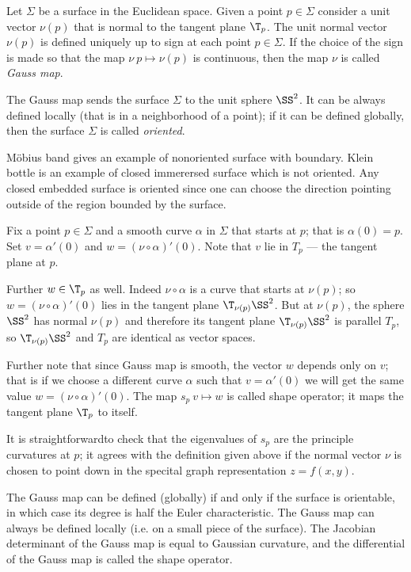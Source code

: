 Let $\Sigma$ be a surface in the Euclidean space.
Given a point $p\in\Sigma$ consider a unit vector $\nu(p)$ that is normal to the tangent plane $\T_p$. 
The unit normal vector $\nu(p)$ is defined uniquely up to sign at each point $p\in \Sigma$.
If the choice of the sign is made so that the map $\nu\:p\mapsto \nu(p)$ is continuous,
then the map $\nu$ is called \emph{Gauss map}.

The Gauss map sends the surface $\Sigma$ to the unit sphere $\SS^2$.
It can be always defined locally (that is in a neighborhood of a point);
if it can be defined globally, then the surface $\Sigma$ is called \emph{oriented}.

M\"obius band gives an example of nonoriented surface with boundary.
Klein bottle is an example of closed immerersed surface which is not oriented.
Any closed embedded surface is oriented since one can choose the  direction pointing outside of the region bounded by the surface.

Fix a point $p\in \Sigma$ and a smooth curve $\alpha$ in $\Sigma$ that starts at $p$;
that is $\alpha(0)=p$.
Set  $v=\alpha'(0)$ and $w=(\nu\circ\alpha)'(0)$.
Note that $v$ lie in $T_p$ --- the tangent plane at $p$.

Further $w\in \T_p$ as well.
Indeed $\nu\circ\alpha$ is a curve that starts at $\nu(p)$;
so $w=(\nu\circ\alpha)'(0)$ lies in the tangent plane $\T_{\nu(p)}\SS^2$.
But at $\nu(p)$, the sphere $\SS^2$ has normal $\nu(p)$ and therefore its tangent plane $\T_{\nu(p)}\SS^2$ is parallel $T_p$, so $\T_{\nu(p)}\SS^2$ and $T_p$ are identical as vector spaces.

Further note that since Gauss map is smooth,
the vector $w$ depends only on $v$;
that is if we choose a different curve $\alpha$ such that $v=\alpha'(0)$ we will get the same value $w=(\nu\circ\alpha)'(0)$.
The map $s_p\:v\mapsto w$ is called shape operator;
it maps the tangent plane $\T_p$ to itself.

It is straightforwardto check that the eigenvalues of $s_p$ are the principle curvatures at $p$; it agrees with the definition given above if the normal vector $\nu$ is chosen to point down in the specital graph representation $z=f(x,y)$.







The Gauss map can be defined (globally) if and only if the surface is orientable, in which case its degree is half the Euler characteristic. The Gauss map can always be defined locally (i.e. on a small piece of the surface). The Jacobian determinant of the Gauss map is equal to Gaussian curvature, and the differential of the Gauss map is called the shape operator. 


















